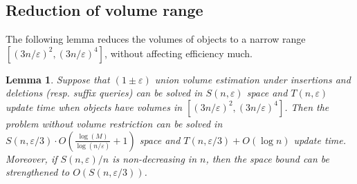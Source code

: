 \documentclass[11pt]{article}
\newtheorem{lemma}[theorem]{Lemma}
\newcommand{\eps}{\varepsilon}
\begin{document}
\subsection{Reduction of volume range}
The following lemma reduces the volumes of objects to a narrow range $[(3n/\eps)^2, (3n/\eps)^4]$, without affecting efficiency much.
\begin{lemma}
    \label{lem:reduce-aspect-ratio}
    Suppose that $(1 \pm \eps)$ union volume estimation under insertions and deletions (resp. suffix queries) can be solved in $S(n,\eps)$ space and $T(n,\eps)$ update time when objects have volumes in $[(3n/\eps)^2, (3n/\eps)^4]$. Then the problem without volume restriction can be solved in $S(n,\eps/3) \cdot O\left(\frac{\log(M)}{\log(n/\eps)} + 1\right)$ space and $T(n,\eps/3) + O(\log n)$ update time. Moreover, if $S(n,\eps)/n$ is non-decreasing in $n$, then the space bound can be strengthened to $O(S(n,\eps/3))$.
\end{lemma}
%
\end{document}
